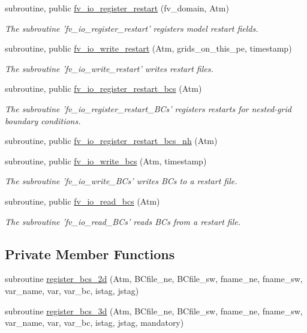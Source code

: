 \begin{DoxyCompactItemize}
subroutine, public \hyperlink{classfv__io__mod_a7176ff0edd93844871b936d9c4381f45}{fv\-\_\-io\-\_\-register\-\_\-restart} (fv\-\_\-domain, Atm)
\begin{DoxyCompactList}\small\item\em The subroutine 'fv\-\_\-io\-\_\-register\-\_\-restart' registers model restart fields. \end{DoxyCompactList}\item 
subroutine, public \hyperlink{classfv__io__mod_a1ad375a9468a15c319155b8bf794222e}{fv\-\_\-io\-\_\-write\-\_\-restart} (Atm, grids\-\_\-on\-\_\-this\-\_\-pe, timestamp)
\begin{DoxyCompactList}\small\item\em The subroutine 'fv\-\_\-io\-\_\-write\-\_\-restart' writes restart files. \end{DoxyCompactList}\item 
subroutine, public \hyperlink{classfv__io__mod_acfb0e5fb70a35bd2557122a21f285057}{fv\-\_\-io\-\_\-register\-\_\-restart\-\_\-bcs} (Atm)
\begin{DoxyCompactList}\small\item\em The subroutine 'fv\-\_\-io\-\_\-register\-\_\-restart\-\_\-\-B\-Cs' registers restarts for nested-\/grid boundary conditions. \end{DoxyCompactList}\item 
subroutine, public \hyperlink{classfv__io__mod_ab18c761d6135c36e0f3bbb1b5969ec86}{fv\-\_\-io\-\_\-register\-\_\-restart\-\_\-bcs\-\_\-nh} (Atm)
\item 
subroutine, public \hyperlink{classfv__io__mod_a2dba504c647cfd53078b4d1e7c980332}{fv\-\_\-io\-\_\-write\-\_\-bcs} (Atm, timestamp)
\begin{DoxyCompactList}\small\item\em The subroutine 'fv\-\_\-io\-\_\-write\-\_\-\-B\-Cs' writes B\-Cs to a restart file. \end{DoxyCompactList}\item 
subroutine, public \hyperlink{classfv__io__mod_ab54bb8ad1c76e485c736bd3d9f45b523}{fv\-\_\-io\-\_\-read\-\_\-bcs} (Atm)
\begin{DoxyCompactList}\small\item\em The subroutine 'fv\-\_\-io\-\_\-read\-\_\-\-B\-Cs' reads B\-Cs from a restart file. \end{DoxyCompactList}\end{DoxyCompactItemize}
\subsection*{Private Member Functions}
\begin{DoxyCompactItemize}
\item 
subroutine \hyperlink{classfv__io__mod_a297598ad854f809ad31661e58c50bd8e}{register\-\_\-bcs\-\_\-2d} (Atm, B\-Cfile\-\_\-ne, B\-Cfile\-\_\-sw, fname\-\_\-ne, fname\-\_\-sw, var\-\_\-name, var, var\-\_\-bc, istag, jstag)
\item 
subroutine \hyperlink{classfv__io__mod_ad70a91b87c0917b70bc746ee744ec710}{register\-\_\-bcs\-\_\-3d} (Atm, B\-Cfile\-\_\-ne, B\-Cfile\-\_\-sw, fname\-\_\-ne, fname\-\_\-sw, var\-\_\-name, var, var\-\_\-bc, istag, jstag, mandatory)
\end{DoxyCompactItemize}
